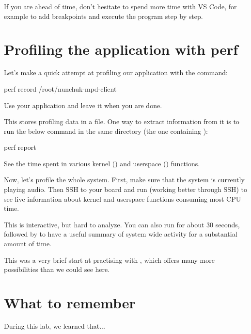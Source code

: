 If you are ahead of time, don't hesitate to spend more time with VS
Code, for example to add breakpoints and execute the program step by
step.

\section{Profiling the application with perf}

Let's make a quick attempt at profiling our application with the
 command:

\begin{bashinput}
perf record /root/nunchuk-mpd-client
\end{bashinput}

Use your application and leave it when you are done.

This stores profiling data in a  file. One way to
extract information from it is to run the below command in the same
directory (the one containing ):

\begin{bashinput}
perf report
\end{bashinput}

See the time spent in various kernel (\code{[k]}) and userspace
(\code{[.]}) functions.

Now, let's profile the whole system. First, make sure that the system is
currently playing audio. Then SSH to your board and run 
(working better through SSH) to see live information about kernel and
userspace functions consuming most CPU time.

This is interactive, but hard to analyze. You can also run  for about 30 seconds, followed by  to have
a useful summary of system wide activity for a substantial amount of time.

This was a very brief start at practising with , which offers
many more possibilities than we could see here.

\section{What to remember}

During this lab, we learned that...

